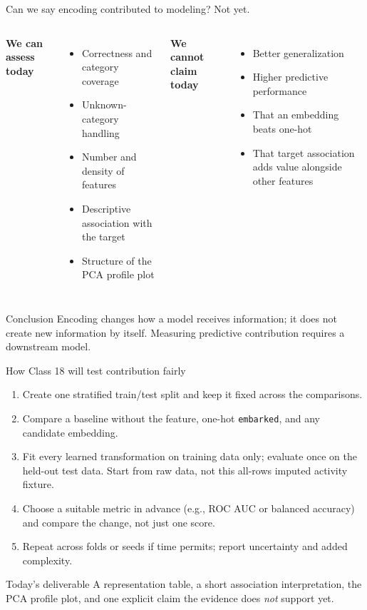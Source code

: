 \begin{frame}{Can we say encoding contributed to modeling? Not yet.}
\begin{columns}[T]
\textbf{We can assess today}
\begin{itemize}
\item Correctness and category coverage
\item Unknown-category handling
\item Number and density of features
\item Descriptive association with the target
\item Structure of the PCA profile plot
\end{itemize}
\textbf{We cannot claim today}
\begin{itemize}
\item Better generalization
\item Higher predictive performance
\item That an embedding beats one-hot
\item That target association adds value alongside other features
\end{itemize}
\end{columns}
\vspace{0.5em}
\begin{alertblock}{Conclusion}
Encoding changes how a model receives information; it does not create new information by itself. Measuring predictive contribution requires a downstream model.
\end{alertblock}
\coursefooter
\end{frame}

\begin{frame}{How Class 18 will test contribution fairly}
\begin{enumerate}
\item Create one stratified train/test split and keep it fixed across the comparisons.
\item Compare a baseline without the feature, one-hot \texttt{embarked}, and any candidate embedding.
\item Fit every learned transformation on training data only; evaluate once on the held-out test data. Start from raw data, not this all-rows imputed activity fixture.
\item Choose a suitable metric in advance (e.g., ROC AUC or balanced accuracy) and compare the change, not just one score.
\item Repeat across folds or seeds if time permits; report uncertainty and added complexity.
\end{enumerate}
\begin{block}{Today's deliverable}
A representation table, a short association interpretation, the PCA profile plot, and one explicit claim the evidence does \emph{not} support yet.
\end{block}
\coursefooter
\end{frame}

